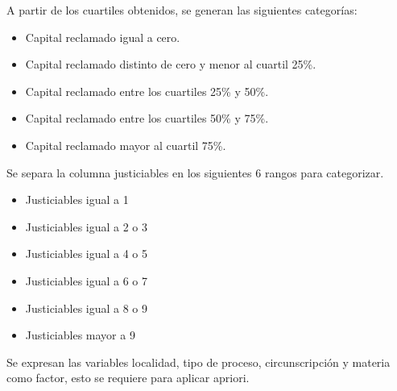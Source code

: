 \documentclass[runningheads,a4paper]{llncs}
\newenvironment{Shaded}{\footnotesize}{}
\newcommand{\KeywordTok}[1]{\textcolor[rgb]{0.00,0.44,0.13}{\textbf{{#1}}}}
\newcommand{\DataTypeTok}[1]{\textcolor[rgb]{0.56,0.13,0.00}{{#1}}}
\newcommand{\StringTok}[1]{\textcolor[rgb]{0.25,0.44,0.63}{{#1}}}
\newcommand{\NormalTok}[1]{{#1}}
\newcommand{\OperatorTok}[1]{\textcolor[rgb]{0.40,0.40,0.40}{{#1}}}
\def\tightlist{} %
\begin{document}
A partir de los cuartiles obtenidos, se generan las siguientes
categorías:

\begin{itemize}
\tightlist
\item
  Capital reclamado igual a cero.
\item
  Capital reclamado distinto de cero y menor al cuartil 25\%.
\item
  Capital reclamado entre los cuartiles 25\% y 50\%.
\item
  Capital reclamado entre los cuartiles 50\% y 75\%.
\item
  Capital reclamado mayor al cuartil 75\%.
\end{itemize}

Se separa la columna justiciables en los siguientes 6 rangos para
categorizar.

\begin{itemize}
\tightlist
\item
  Justiciables igual a 1
\item
  Justiciables igual a 2 o 3
\item
  Justiciables igual a 4 o 5
\item
  Justiciables igual a 6 o 7
\item
  Justiciables igual a 8 o 9
\item
  Justiciables mayor a 9
\end{itemize}

Se expresan las variables localidad, tipo de proceso, circunscripción y
materia como factor, esto se requiere para aplicar apriori.

\begin{Shaded}
\end{Shaded}
\end{document}
